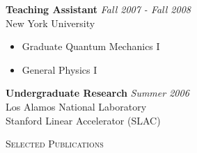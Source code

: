\documentclass[9pt]{article}
\newenvironment{changemargin}[2]{%
  \begin{list}{}{%
    \setlength{\topsep}{0pt}%
    \setlength{\leftmargin}{#1}%
    \setlength{\rightmargin}{#2}%
    \setlength{\listparindent}{\parindent}%
    \setlength{\itemindent}{\parindent}%
    \setlength{\parsep}{\parskip}%
  }%
  \item[]}{\end{list}
}
\newcommand{\lineover}{
	\begin{changemargin}{-0.05in}{-0.05in}
		\vspace*{-8pt}
		\hrulefill \\
		\vspace*{-2pt}
	\end{changemargin}
}
\newcommand{\header}[1]{
	\begin{changemargin}{-0.5in}{-0.5in}
		\scshape{#1}\\
  	\lineover
	\end{changemargin}
}
\newenvironment{body} {
	\vspace*{-16pt}
	\begin{changemargin}{-0.25in}{-0.5in}
  }	
	{\end{changemargin}
}
\begin{document}
\begin{body}
\begin{quotation}
        \end{quotation}
        
        \medskip

	\textbf {Teaching Assistant} \hfill \emph{Fall 2007 - Fall 2008}\\
        New York University \\
	\vspace*{-4pt}
	\begin{itemize} \itemsep -0pt
		\item Graduate Quantum Mechanics I
                \item General Physics I
	\end{itemize}

        \medskip

	\textbf {Undergraduate Research} \hfill \emph{Summer 2006}\\
        Los Alamos National Laboratory \\
        Stanford Linear Accelerator (SLAC) \\

\end{body}

\smallskip



\header{Selected Publications}
\end{document}
